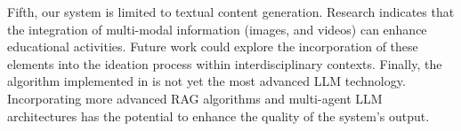 Fifth, our system is limited to textual content generation. Research indicates that the integration of multi-modal information (\eg images, and videos) can enhance educational activities. Future work could explore the incorporation of these elements into the ideation process within interdisciplinary contexts.
Finally, the algorithm implemented in \name{} is not yet the most advanced LLM technology. 
Incorporating more advanced RAG algorithms and multi-agent LLM architectures has the potential to enhance the quality of the system’s output.